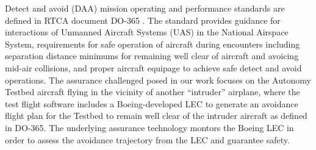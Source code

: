 Detect and avoid (DAA) mission operating and performance standards are defined in RTCA document DO-365 \cite{DO_365}.  The standard provides guidance for interactions of Unmanned Aircraft Systems (UAS) in the National Airspace System, requirements for safe operation of aircraft during encounters including separation distance minimums for remaining well clear of aircraft and avoicing mid-air collisions, and proper aircraft equipage to achieve safe detect and avoid operations.
The assurance challenged posed in our work focuses on the Autonomy Testbed aircraft flying in the vicinity of another ``intruder'' airplane, where the test flight software includes a Boeing-developed LEC to generate an avoidance flight plan for the Testbed to remain well clear of the intruder aircraft as defined in DO-365.  The underlying assurance technology montors the Boeing LEC in order to assess the avoidance trajectory from the LEC and guarantee safety. 

